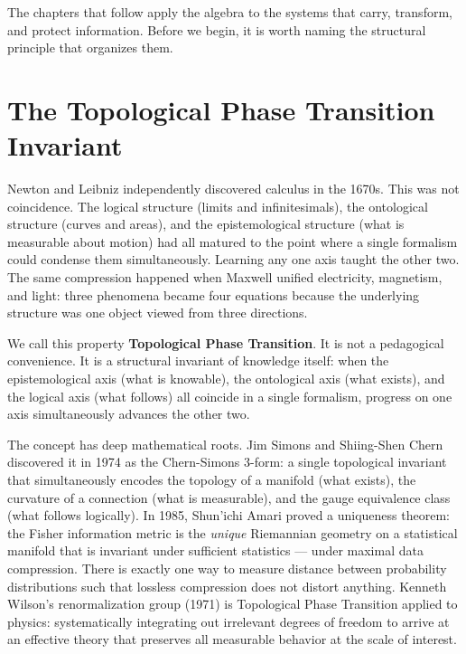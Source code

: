 
The chapters that follow apply the algebra to the systems that carry, transform, and protect information. Before we begin, it is worth naming the structural principle that organizes them.

\section*{The Topological Phase Transition Invariant}

Newton and Leibniz independently discovered calculus in the 1670s. This was not coincidence. The logical structure (limits and infinitesimals), the ontological structure (curves and areas), and the epistemological structure (what is measurable about motion) had all matured to the point where a single formalism could condense them simultaneously. Learning any one axis taught the other two. The same compression happened when Maxwell unified electricity, magnetism, and light: three phenomena became four equations because the underlying structure was one object viewed from three directions.

We call this property \textbf{Topological Phase Transition}. It is not a pedagogical convenience. It is a structural invariant of knowledge itself: when the epistemological axis (what is knowable), the ontological axis (what exists), and the logical axis (what follows) all coincide in a single formalism, progress on one axis simultaneously advances the other two.

The concept has deep mathematical roots. Jim Simons and Shiing-Shen Chern discovered it in 1974 as the Chern-Simons 3-form: a single topological invariant that simultaneously encodes the topology of a manifold (what exists), the curvature of a connection (what is measurable), and the gauge equivalence class (what follows logically). In 1985, Shun'ichi Amari proved a uniqueness theorem: the Fisher information metric is the \emph{unique} Riemannian geometry on a statistical manifold that is invariant under sufficient statistics --- under maximal data compression. There is exactly one way to measure distance between probability distributions such that lossless compression does not distort anything. Kenneth Wilson's renormalization group (1971) is Topological Phase Transition applied to physics: systematically integrating out irrelevant degrees of freedom to arrive at an effective theory that preserves all measurable behavior at the scale of interest.

